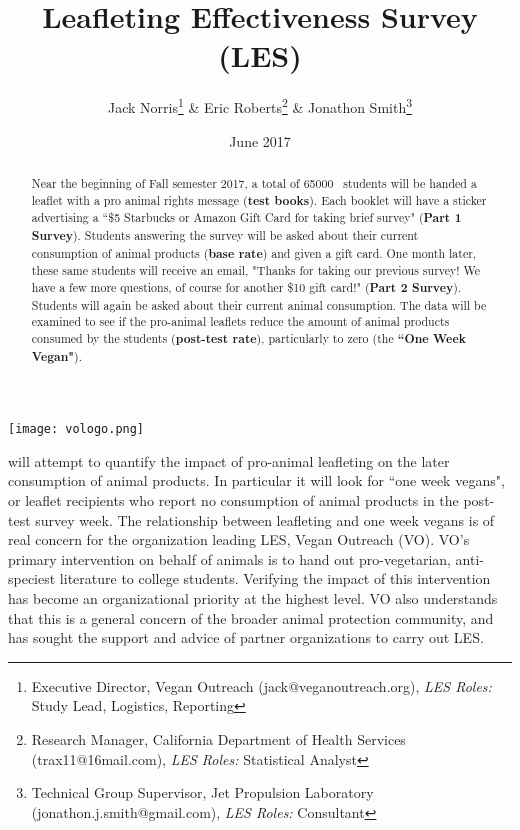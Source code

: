 \documentclass{tufte-handout}
\title{Leafleting Effectiveness Survey (LES)}
\author[Jack Norris \& Eric Roberts \& Jonathon Smith]{Jack Norris\thanks{Executive Director, Vegan Outreach (jack@veganoutreach.org), \textit{LES Roles:} Study Lead, Logistics, Reporting } \& Eric Roberts\thanks{Research Manager, California Department of Health Services (trax11@16mail.com), \textit{LES Roles:} Statistical Analyst} \& Jonathon Smith\thanks{Technical Group Supervisor, Jet Propulsion Laboratory (jonathon.j.smith@gmail.com), \textit{LES Roles:} Consultant}}
\date{June 2017} %
\newcommand{\les}[0]{\textsc{LES}}%
\newcommand{\totalbooklets}[0]{\textsc{65000}}
\begin{document}
\maketitle%


\begin{abstract}
\noindent

Near the beginning of Fall semester 2017, a total of \totalbooklets~ 
students will be handed a leaflet with a pro animal rights message 
(\textbf{test books}). Each booklet will have a
sticker advertising a ``\$5 Starbucks or Amazon Gift Card for taking
brief survey" (\textbf{Part 1 Survey}). Students answering the survey will be 
asked about their current consumption of animal products (\textbf{base rate}) 
and given a gift card. One month later, these same students will receive an 
email, "Thanks for taking our previous survey! We have a few more questions, 
of course for another \$10 gift card!" (\textbf{Part 2 Survey}). Students 
will again be asked about their current animal consumption. The data will
be examined to see if the pro-animal leaflets reduce the amount of
animal products consumed by the students (\textbf{post-test rate}), 
particularly to zero (the \textbf{``One Week Vegan"}). 

\end{abstract}

\begin{marginfigure}[0 in]%
  \raggedleft
  \texttt{[image: vologo.png]}
  \caption{Vegan Outreach was founded in 1993 and has since handed out more
  than 30 million pro-vegetarian leaflets. They are the organization leading 
  the proposed LES Study.}
  \label{fig:vologo}
\end{marginfigure}
  
\newthought{The Leafleting Effectiveness Survey (\les)} will attempt
to quantify the impact of pro-animal leafleting on the later 
consumption of animal products. In particular it will look for 
``one week vegans", or leaflet recipients who report no consumption of animal 
products in the post-test survey week. The relationship between leafleting 
and one week vegans is of real concern for the organization 
leading \les, Vegan Outreach (VO). VO's primary intervention on behalf of 
animals is to hand out pro-vegetarian, anti-speciest literature to 
college students. Verifying the impact of this intervention has become 
an organizational priority at the highest level. VO also understands that 
this is a general concern of the broader animal protection community, and 
has sought the support and advice of partner organizations to carry out \les.
\end{document}
